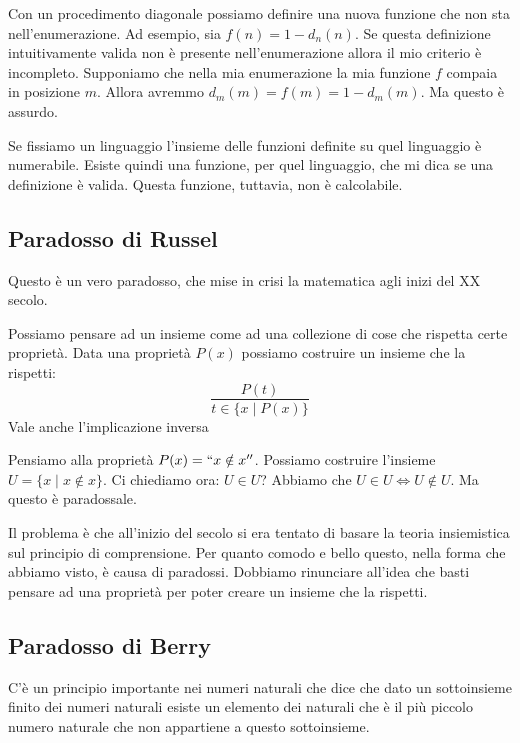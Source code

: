 Con un procedimento diagonale possiamo definire una nuova funzione che non sta nell'enumerazione. Ad
esempio, sia $f(n) = 1 - d_{n}(n)$. Se questa definizione intuitivamente valida non è presente
nell'enumerazione allora il mio criterio è incompleto.  Supponiamo che nella mia enumerazione la
mia funzione $f$ compaia in posizione $m$. Allora avremmo $d_m(m) = f(m) = 1 - d_m(m)$. Ma questo è
assurdo.

Se fissiamo un linguaggio l'insieme delle funzioni definite su quel linguaggio è numerabile. Esiste
quindi una funzione, per quel linguaggio, che mi dica se una definizione è valida. Questa funzione,
tuttavia, non è calcolabile.

\subsection{Paradosso di Russel}

Questo è un vero paradosso, che mise in crisi la matematica agli inizi del XX secolo.

Possiamo pensare ad un insieme come ad una collezione di cose che rispetta certe proprietà. Data
una proprietà $P(x)$ possiamo costruire un insieme che la rispetti:
\begin{equation*}
    \frac{P(t)}{t \in \{x \mid P(x)\}} %
\end{equation*}
Vale anche l'implicazione inversa

Pensiamo alla proprietà $P(x) = ``x \notin x''$. Possiamo costruire l'insieme $U = \{x \mid x \notin x\}$. Ci
chiediamo ora: $U \in U$? Abbiamo che $U \in U \iff U \notin U$. Ma questo è paradossale.

Il problema è che all'inizio del secolo si era tentato di basare la teoria insiemistica sul
principio di comprensione. Per quanto comodo e bello questo, nella forma che abbiamo visto, è causa
di paradossi. Dobbiamo rinunciare all'idea che basti pensare ad una proprietà per poter creare un
insieme che la rispetti.

\subsection{Paradosso di Berry}

C'è un principio importante nei numeri naturali che dice che dato un sottoinsieme finito dei numeri
naturali esiste un elemento dei naturali che è il più piccolo numero naturale che non appartiene a
questo sottoinsieme.

